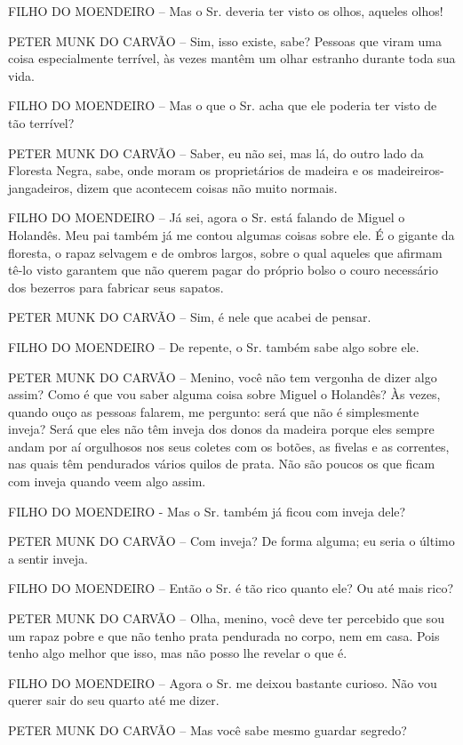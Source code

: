 FILHO DO MOENDEIRO -- Mas o Sr. deveria ter visto os olhos, aqueles
olhos!

PETER MUNK DO CARVÃO -- Sim, isso existe, sabe? Pessoas que viram uma
coisa especialmente terrível, às vezes mantêm um olhar estranho durante
toda sua vida.

FILHO DO MOENDEIRO -- Mas o que o Sr. acha que ele poderia ter visto de
tão terrível?

PETER MUNK DO CARVÃO -- Saber, eu não sei, mas lá, do outro lado da
Floresta Negra, sabe, onde moram os proprietários de madeira e os
madeireiros-jangadeiros, dizem que acontecem coisas não muito normais.

FILHO DO MOENDEIRO -- Já sei, agora o Sr. está falando de Miguel o
Holandês. Meu pai também já me contou algumas coisas sobre ele. É o
gigante da floresta, o rapaz selvagem e de ombros largos, sobre o qual
aqueles que afirmam tê-lo visto garantem que não querem pagar do próprio
bolso o couro necessário dos bezerros para fabricar seus sapatos.

PETER MUNK DO CARVÃO -- Sim, é nele que acabei de pensar.

FILHO DO MOENDEIRO -- De repente, o Sr. também sabe algo sobre ele.

PETER MUNK DO CARVÃO -- Menino, você não tem vergonha de dizer algo
assim? Como é que vou saber alguma coisa sobre Miguel o Holandês? Às
vezes, quando ouço as pessoas falarem, me pergunto: será que não é
simplesmente inveja? Será que eles não têm inveja dos donos da madeira
porque eles sempre andam por aí orgulhosos nos seus coletes com os
botões, as fivelas e as correntes, nas quais têm pendurados vários
quilos de prata. Não são poucos os que ficam com inveja quando veem algo
assim.

FILHO DO MOENDEIRO - Mas o Sr. também já ficou com inveja dele?

PETER MUNK DO CARVÃO -- Com inveja? De forma alguma; eu seria o último a
sentir inveja.

FILHO DO MOENDEIRO -- Então o Sr. é tão rico quanto ele? Ou até mais
rico?

PETER MUNK DO CARVÃO -- Olha, menino, você deve ter percebido que sou um
rapaz pobre e que não tenho prata pendurada no corpo, nem em casa. Pois
tenho algo melhor que isso, mas não posso lhe revelar o que é.

FILHO DO MOENDEIRO -- Agora o Sr. me deixou bastante curioso. Não vou
querer sair do seu quarto até me dizer.

PETER MUNK DO CARVÃO -- Mas você sabe mesmo guardar segredo?

